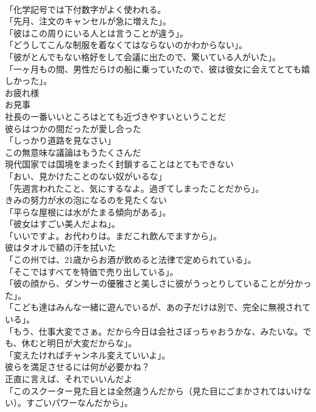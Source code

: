 \documentclass[8pt]{extreport}
\begin{document}
\begin{CJK}{UTF8}{min}
\\	「化学記号では下付数字がよく使われる。	
\\	「先月、注文のキャンセルが急に増えた」。	
\\	「彼はこの周りにいる人とは言うことが違う」。	
\\	「どうしてこんな制服を着なくてはならないのかわからない」。	
\\	「彼がとんでもない格好をして会議に出たので、驚いている人がいた」。	
\\	「一ヶ月もの間、男性だらけの船に乗っていたので、彼は彼女に会えてとても嬉しかった」。	
\\	お疲れ様 
\\	お見事	
\\	社長の一番いいところはとても近づきやすいということだ	
\\	彼らはつかの間だったが愛し合った	
\\	「しっかり道路を見なさい」	
\\	この無意味な議論はもうたくさんだ	
\\	現代国家では国境をまったく封鎖することはとてもできない	
\\	「おい、見かけたことのない奴がいるな」	
\\	「先週言われたこと、気にするなよ。過ぎてしまったことだから」。	
\\	きみの努力が水の泡になるのを見たくない	
\\	「平らな屋根には水がたまる傾向がある」。	
\\	「彼女はすごい美人だよね」。	
\\	「いいですよ。お代わりは。まだこれ飲んでますから」。	
\\	彼はタオルで額の汗を拭いた	
\\	「この州では、21歳からお酒が飲めると法律で定められている」。	
\\	「そこではすべてを特価で売り出している」。	
\\	「彼の顔から、ダンサーの優雅さと美しさに彼がうっとりしていることが分かった」。	
\\	「こども達はみんな一緒に遊んでいるが、あの子だけは別で、完全に無視されている」。	
\\	「もう、仕事大変でさぁ。だから今日は会社さぼっちゃおうかな、みたいな。でも、休むと明日が大変だからな」。	
\\	「変えたければチャンネル変えていいよ」。	
\\	彼らを満足させるには何が必要かね？	
\\	正直に言えば、それでいいんだよ	
\\	「このスクーター見た目とは全然違うんだから（見た目にごまかされてはいけない）。すごいパワーなんだから」。	

\end{CJK}
\end{document}
